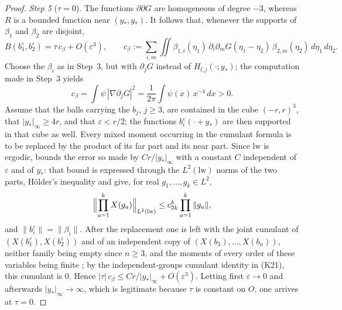 \documentclass[11pt,letterpaper,reqno]{amsart}
\theoremstyle{definition}
\begin{document}
\begin{proof}
\emph{Step 5} ($\tau=0$).
The functions $\partial\partial G$ are homogeneous of degree $-3$, whereas $R$ is a bounded function near $(y_*,y_*)$.
It follows that, whenever the supports of $\beta_1$ and $\beta_2$ are disjoint,
\begin{equation*}
B(b_1^\varepsilon,b_2^\varepsilon)=\tau\,c_\beta+O(\varepsilon^3),\qquad c_\beta:=\sum_{i,m}\iint\beta_{1,i}(\eta_1)\,\partial_i\partial_mG(\eta_1-\eta_2)\,\beta_{2,m}(\eta_2)\,d\eta_1\,d\eta_2.
\end{equation*}
Choose the $\beta_i$ as in Step~3, but with $\partial_jG$ instead of $H_{l,j}(\cdot;y_*)$; the computation made in Step~3 yields
\begin{equation*}
c_\beta=\int\psi\,|\nabla\partial_jG|^2=\frac1{2\pi}\int\psi(x)\,x^{-4}\,dx>0.
\end{equation*}
Assume that the balls carrying the $b_j$, $j\ge3$, are contained in the cube $(-r,r)^3$, that $|y_*|_\infty\ge4r$, and that $\varepsilon<r/2$; the functions $b_i^\varepsilon(\cdot+y_*)$ are then supported in that cube as well.
Every mixed moment occurring in the cumulant formula is to be replaced by the product of its far part and its near part.
Since $\mathrm{lw}$ is ergodic, \cite[Theorem~12.39; Theorem~1.4, Part~II\,(E4)]{QEDII} bounds the error so made by $Cr/|y_*|_\infty$ with a constant $C$ independent of $\varepsilon$ and of $y_*$:
that bound is expressed through the $L^2(\mathrm{lw})$ norms of the two parts, H\"older's inequality and \cite[Lemma~14.3\,(a)]{QEDII} give, for real $g_1,\dots,g_k\in L^2$,
\begin{equation*}
\Bigl\|\prod_{a=1}^kX(g_a)\Bigr\|_{L^2(\mathrm{lw})}\le c_{2k}^k\prod_{a=1}^k\|g_a\|,
\end{equation*}
and $\|b_i^\varepsilon\|=\|\beta_i\|$.
After the replacement one is left with the joint cumulant of $(X(b_1^\varepsilon),X(b_2^\varepsilon))$ and of an independent copy of $(X(b_3),\dots,X(b_n))$, neither family being empty since $n\ge3$, and the moments of every order of these variables being finite \cite[Lemma~14.3\,(a)]{QEDII};
by the independent-groups cumulant identity in (K21), this cumulant is $0$.
Hence $|\tau|\,c_\beta\le Cr/|y_*|_\infty+O(\varepsilon^3)$.
Letting first $\varepsilon\to0$ and afterwards $|y_*|_\infty\to\infty$, which is legitimate because $\tau$ is constant on $O$, one arrives at $\tau=0$.


\end{proof}
\end{document}
